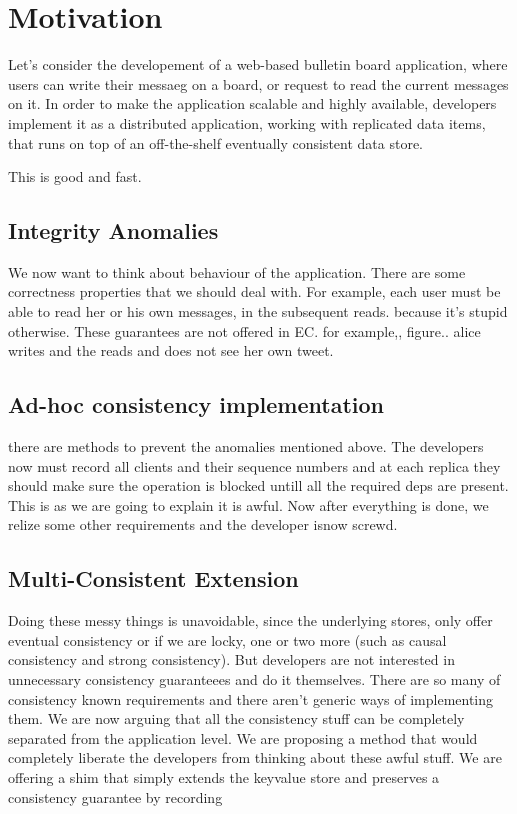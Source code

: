 \section{Motivation}

Let's consider the developement of a web-based bulletin board application, where
users can write their messaeg on a board, or request to read the current
messages on it.
In order to make the application scalable and highly
available, developers implement it as a distributed application, working
with replicated data items, that runs on top of an off-the-shelf
eventually consistent data store. 






This is good and fast.
\subsection{Integrity Anomalies}
We now want to think about behaviour of the application. There are some
correctness properties that we should deal with. For example, each user
must be able to read her or his own messages, in the subsequent reads.
because it's stupid otherwise.
These guarantees are not offered in EC. for example,, figure.. 
alice writes and the reads and does not see her own tweet. 
\subsection{Ad-hoc consistency implementation}
there are methods to prevent the anomalies mentioned above. The
developers now must record all clients and their sequence numbers and at
each replica they should make sure the operation is blocked untill all
the required deps are present. 
This is as we are going to explain it is awful. 
Now after everything is done, we relize some other requirements and the
developer isnow screwd. 
\subsection{Multi-Consistent Extension}
Doing these messy things is unavoidable, since the underlying stores,
only offer eventual consistency or if we are locky, one or two more
(such as causal consistency and strong consistency). But developers are
not interested in unnecessary consistency guaranteees and do it
themselves. There are so many of consistency known requirements and
there aren't generic ways of implementing them.
We are now arguing that all the consistency stuff can be
completely separated from the application level. We are proposing a
method that would completely liberate the developers from thinking about
these awful stuff. We are offering a shim that simply extends the
keyvalue store and preserves a consistency guarantee by recording
